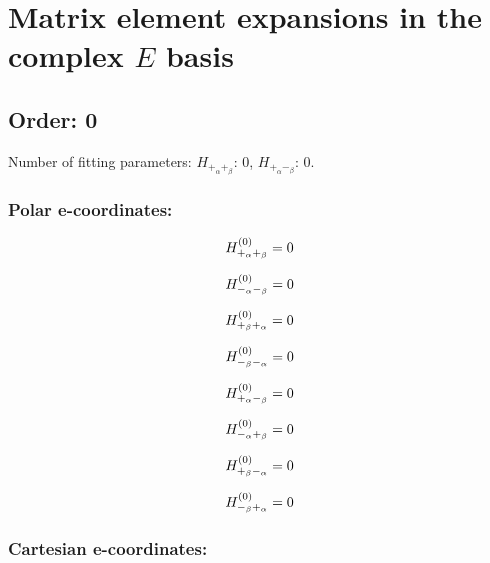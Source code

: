 \documentclass[fleqn]{article}
\begin{document}
\section{Matrix element expansions in the complex $E$ basis}
\subsection{Order: 0}
Number of fitting parameters: $H_{+_{\alpha}+_{\beta}}$: $0$, $H_{+_{\alpha}-_{\beta}}$: $0$.
\subsubsection*{Polar e-coordinates:}

\begin{dmath*}
H_{+_{\alpha}+_{\beta}}^{(0)}=0\\
\end{dmath*}

\begin{dmath*}
H_{-_{\alpha}-_{\beta}}^{(0)}=0\\
\end{dmath*}

\begin{dmath*}
H_{+_{\beta}+_{\alpha}}^{(0)}=0\\
\end{dmath*}

\begin{dmath*}
H_{-_{\beta}-_{\alpha}}^{(0)}=0\\
\end{dmath*}

\begin{dmath*}
H_{+_{\alpha}-_{\beta}}^{(0)}=0\\
\end{dmath*}

\begin{dmath*}
H_{-_{\alpha}+_{\beta}}^{(0)}=0\\
\end{dmath*}

\begin{dmath*}
H_{+_{\beta}-_{\alpha}}^{(0)}=0\\
\end{dmath*}

\begin{dmath*}
H_{-_{\beta}+_{\alpha}}^{(0)}=0\\
\end{dmath*}
\subsubsection*{Cartesian e-coordinates:}
\end{document}
